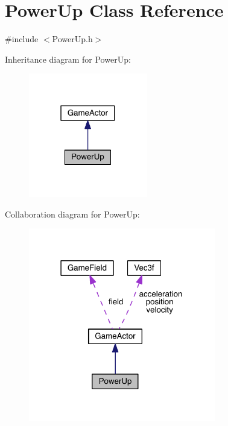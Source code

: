 \hypertarget{class_power_up}{\section{Power\+Up Class Reference}
\label{class_power_up}
}


{\ttfamily \#include $<$Power\+Up.\+h$>$}



Inheritance diagram for Power\+Up\+:\nopagebreak
\begin{figure}[H]
\begin{center}
\leavevmode
\includegraphics[width=147pt]{class_power_up__inherit__graph}
\end{center}
\end{figure}


Collaboration diagram for Power\+Up\+:\nopagebreak
\begin{figure}[H]
\begin{center}
\leavevmode
\includegraphics[width=231pt]{class_power_up__coll__graph}
\end{center}
\end{figure}
